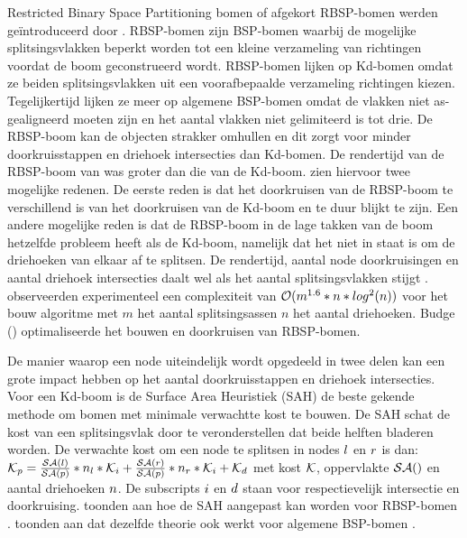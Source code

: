 Restricted Binary Space Partitioning bomen of afgekort RBSP-bomen werden geïntroduceerd door \authorKammaje{ }\cite{Kammaje}.
RBSP-bomen zijn BSP-bomen waarbij de mogelijke splitsingsvlakken beperkt worden tot een kleine verzameling van richtingen voordat de boom geconstrueerd wordt. 
RBSP-bomen lijken op Kd-bomen omdat ze beiden splitsingsvlakken uit een voorafbepaalde verzameling richtingen kiezen.
Tegelijkertijd lijken ze meer op algemene BSP-bomen omdat de vlakken niet as-gealigneerd moeten zijn en het aantal vlakken niet gelimiteerd is tot drie.
De RBSP-boom kan de objecten strakker omhullen en dit zorgt voor minder doorkruisstappen en driehoek intersecties dan Kd-bomen. 
De rendertijd van de RBSP-boom van \cite{Kammaje} was groter dan die van de Kd-boom.
\authorIze{ }zien hiervoor twee mogelijke redenen. 
De eerste reden is dat het doorkruisen van de RBSP-boom te verschillend is van het doorkruisen van de Kd-boom en te duur blijkt te zijn.
Een andere mogelijke reden is dat de RBSP-boom in de lage takken van de boom hetzelfde probleem heeft als de Kd-boom, namelijk dat het niet in staat is om de driehoeken van elkaar af te splitsen.
De rendertijd, aantal node doorkruisingen en aantal driehoek intersecties daalt wel als het aantal splitsingsvlakken stijgt \cite{Kammaje}.
\authorKammaje{ }observeerden experimenteel een complexiteit van $\mathcal{O}(m^{1.6}*n*log^2(n))$ voor het bouw algoritme met $m$ het aantal splitsingsassen $n$ het aantal driehoeken.
Budge (\cite{Budge}) optimaliseerde het bouwen en doorkruisen van RBSP-bomen.

De manier waarop een node uiteindelijk wordt opgedeeld in twee delen kan een grote impact hebben op het aantal doorkruisstappen en driehoek intersecties.
Voor een Kd-boom is de Surface Area Heuristiek (SAH) de beste gekende methode om bomen met minimale verwachtte kost te bouwen.
De SAH schat de kost van een splitsingsvlak door te veronderstellen dat beide helften bladeren worden. 
De verwachte kost om een node {\symNodeExample} te splitsen in nodes ${l}$ en ${r}$ is dan: $\mathcal{K}_p = \frac{\mathcal{SA}(l)}{\mathcal{SA}(p)}*n_l*\mathcal{K}_i + \frac{\mathcal{SA}(r)}{\mathcal{SA}(p)}*n_r*\mathcal{K}_i + \mathcal{K}_d$ met kost $\mathcal{K}$, oppervlakte $\mathcal{SA}()$ en aantal driehoeken $n$.
De subscripts ${i}$ en ${d}$ staan voor respectievelijk intersectie en doorkruising.
\authorKammaje{ }toonden aan hoe de SAH aangepast kan worden voor RBSP-bomen \cite{Kammaje}. 
\authorIze{ }toonden aan dat dezelfde theorie ook werkt voor algemene BSP-bomen \cite{Ize}.

